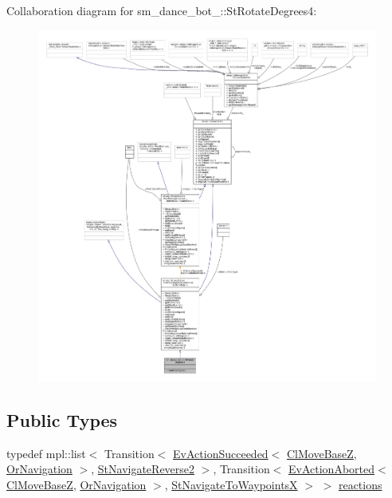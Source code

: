 Collaboration diagram for sm\+\_\+dance\+\_\+bot\+\_\+:\+:St\+Rotate\+Degrees4\+:
\nopagebreak
\begin{figure}[H]
\begin{center}
\leavevmode
\includegraphics[width=350pt]{structsm__dance__bot__2_1_1StRotateDegrees4__coll__graph}
\end{center}
\end{figure}
\subsection*{Public Types}
\begin{DoxyCompactItemize}
\item 
typedef mpl\+::list$<$ Transition$<$ \hyperlink{structsmacc_1_1default__events_1_1EvActionSucceeded}{Ev\+Action\+Succeeded}$<$ \hyperlink{classcl__move__base__z_1_1ClMoveBaseZ}{Cl\+Move\+BaseZ}, \hyperlink{classsm__dance__bot__2_1_1OrNavigation}{Or\+Navigation} $>$, \hyperlink{structsm__dance__bot__2_1_1StNavigateReverse2}{St\+Navigate\+Reverse2} $>$, Transition$<$ \hyperlink{structsmacc_1_1default__events_1_1EvActionAborted}{Ev\+Action\+Aborted}$<$ \hyperlink{classcl__move__base__z_1_1ClMoveBaseZ}{Cl\+Move\+BaseZ}, \hyperlink{classsm__dance__bot__2_1_1OrNavigation}{Or\+Navigation} $>$, \hyperlink{structsm__dance__bot__2_1_1StNavigateToWaypointsX}{St\+Navigate\+To\+WaypointsX} $>$ $>$ \hyperlink{structsm__dance__bot__2_1_1StRotateDegrees4_a0724d2e37c38e720d3a9c13069d466a1}{reactions}
\end{DoxyCompactItemize}
